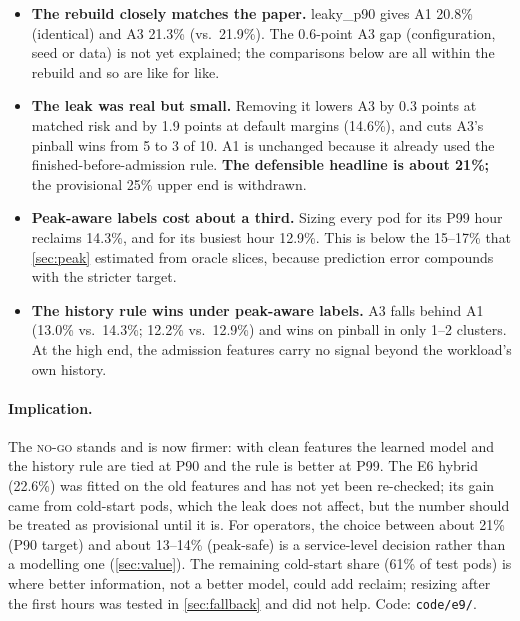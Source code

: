 \begin{itemize}
  \item \textbf{The rebuild closely matches the paper.} leaky\_p90 gives A1 20.8\% (identical) and A3 21.3\% (vs.\ 21.9\%). The 0.6-point A3 gap (configuration, seed or data) is not yet explained; the comparisons below are all within the rebuild and so are like for like.
  \item \textbf{The leak was real but small.} Removing it lowers A3 by 0.3 points at matched risk and by 1.9 points at default margins (14.6\%), and cuts A3's pinball wins from 5 to 3 of 10. A1 is unchanged because it already used the finished-before-admission rule. \textbf{The defensible headline is about 21\%;} the provisional 25\% upper end is withdrawn.
  \item \textbf{Peak-aware labels cost about a third.} Sizing every pod for its P99 hour reclaims 14.3\%, and for its busiest hour 12.9\%. This is below the 15--17\% that \cref{sec:peak} estimated from oracle slices, because prediction error compounds with the stricter target.
  \item \textbf{The history rule wins under peak-aware labels.} A3 falls behind A1 (13.0\% vs.\ 14.3\%; 12.2\% vs.\ 12.9\%) and wins on pinball in only 1--2 clusters. At the high end, the admission features carry no signal beyond the workload's own history.
\end{itemize}

\paragraph{Implication.} The \textsc{no-go} stands and is now firmer: with clean features the learned model and the history rule are tied at P90 and the rule is better at P99. The E6 hybrid (22.6\%) was fitted on the old features and has not yet been re-checked; its gain came from cold-start pods, which the leak does not affect, but the number should be treated as provisional until it is. For operators, the choice between about 21\% (P90 target) and about 13--14\% (peak-safe) is a service-level decision rather than a modelling one (\cref{sec:value}). The remaining cold-start share (61\% of test pods) is where better information, not a better model, could add reclaim; resizing after the first hours was tested in \cref{sec:fallback} and did not help. Code: \texttt{code/e9/}.
